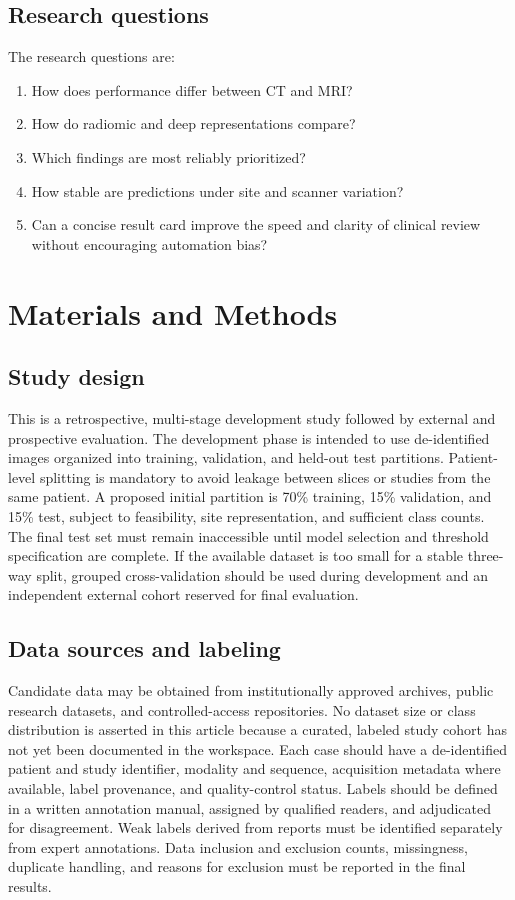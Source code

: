 \documentclass[10pt,a4paper]{article}
\begin{document}
\subsection{Research questions}
The research questions are:
\begin{enumerate}[leftmargin=*,nosep]
\item How does performance differ between CT and MRI?
\item How do radiomic and deep representations compare?
\item Which findings are most reliably prioritized?
\item How stable are predictions under site and scanner variation?
\item Can a concise result card improve the speed and clarity of clinical review without encouraging automation bias?
\end{enumerate}

\section{Materials and Methods}
\subsection{Study design}
This is a retrospective, multi-stage development study followed by external and prospective evaluation. The development phase is intended to use de-identified images organized into training, validation, and held-out test partitions. Patient-level splitting is mandatory to avoid leakage between slices or studies from the same patient. A proposed initial partition is 70\% training, 15\% validation, and 15\% test, subject to feasibility, site representation, and sufficient class counts. The final test set must remain inaccessible until model selection and threshold specification are complete. If the available dataset is too small for a stable three-way split, grouped cross-validation should be used during development and an independent external cohort reserved for final evaluation.

\subsection{Data sources and labeling}
Candidate data may be obtained from institutionally approved archives, public research datasets, and controlled-access repositories. No dataset size or class distribution is asserted in this article because a curated, labeled study cohort has not yet been documented in the workspace. Each case should have a de-identified patient and study identifier, modality and sequence, acquisition metadata where available, label provenance, and quality-control status. Labels should be defined in a written annotation manual, assigned by qualified readers, and adjudicated for disagreement. Weak labels derived from reports must be identified separately from expert annotations. Data inclusion and exclusion counts, missingness, duplicate handling, and reasons for exclusion must be reported in the final results.
\end{document}
